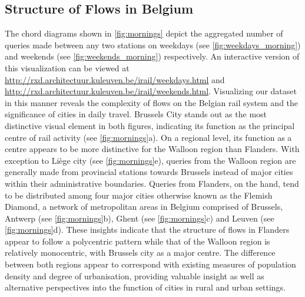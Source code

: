 \documentclass{sig-alternate}
\begin{document}
\subsection{Structure of Flows in Belgium}

The chord diagrams shown in \cref{fig:mornings} depict the aggregated number of queries made between any two stations on weekdays (see \cref{fig:weekdays_morning}) and weekends (see \cref{fig:weekends_morning}) respectively. 
An interactive version of this visualization can be viewed at \url{http://rxd.architectuur.kuleuven.be/irail/weekdays.html} and \url{http://rxd.architectuur.kuleuven.be/irail/weekends.html}. 
Visualizing our dataset in this manner reveals the complexity of flows on the Belgian rail system and the significance of cities in daily travel.
Brussels City stands out as the most distinctive visual element in both figures, indicating its function as the principal centre of rail activity (see \cref{fig:mornings}a).
On a regional level, its function as a centre appears to be more distinctive for the Walloon region than Flanders.
With exception to Liège city (see \cref{fig:mornings}e), queries from the Walloon region are generally made from provincial stations towards Brussels instead of major cities within their administrative boundaries. 
Queries from Flanders, on the hand, tend to be distributed among four major cities otherwise known as the Flemish Diamond, a network of metropolitan areas in Belgium comprised of Brussels, Antwerp (see \cref{fig:mornings}b), Ghent (see \cref{fig:mornings}c) and Leuven (see \cref{fig:mornings}d). 
These insights indicate that the structure of flows in Flanders appear to follow a polycentric pattern while that of the Walloon region is relatively monocentric, with Brussels city as a major centre.
The difference between both regions appear to correspond with existing measures of population density and degree of urbanisation, providing valuable insight as well as alternative perspectives into the function of cities in rural and urban settings.
\end{document}

